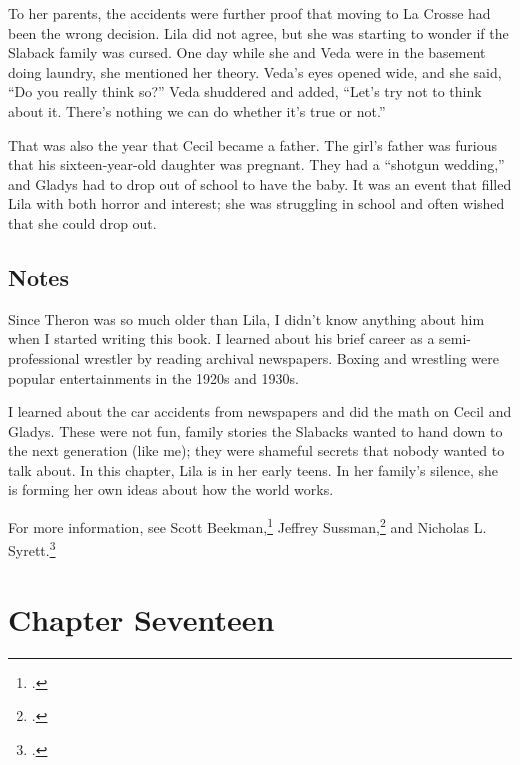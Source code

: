 \documentclass[
  american,
  letterpaper,
]{book}
\begin{document}
To her parents, the accidents were further proof that moving to La
Crosse had been the wrong decision. Lila did not agree, but she was
starting to wonder if the Slaback family was cursed. One day while she
and Veda were in the basement doing laundry, she mentioned her theory.
Veda's eyes opened wide, and she said, ``Do you really think so?'' Veda
shuddered and added, ``Let's try not to think about it. There's nothing
we can do whether it's true or not.''

That was also the year that Cecil became a father. The girl's father was
furious that his sixteen-year-old daughter was pregnant. They had a
``shotgun wedding,'' and Gladys had to drop out of school to have the
baby. It was an event that filled Lila with both horror and interest;
she was struggling in school and often wished that she could drop out.

\section{Notes}\label{notes-17}

Since Theron was so much older than Lila, I didn't know anything about
him when I started writing this book. I learned about his brief career
as a semi-professional wrestler by reading archival newspapers. Boxing
and wrestling were popular entertainments in the 1920s and 1930s.

I learned about the car accidents from newspapers and did the math on
Cecil and Gladys. These were not fun, family stories the Slabacks wanted
to hand down to the next generation (like me); they were shameful
secrets that nobody wanted to talk about. In this chapter, Lila is in
her early teens. In her family's silence, she is forming her own ideas
about how the world works.

For more information, see Scott Beekman,\footnote{.} Jeffrey Sussman,\footnote{.} and Nicholas L. Syrett.\footnote{.}


\chapter{Chapter Seventeen}\label{chapter-seventeen}
\end{document}
